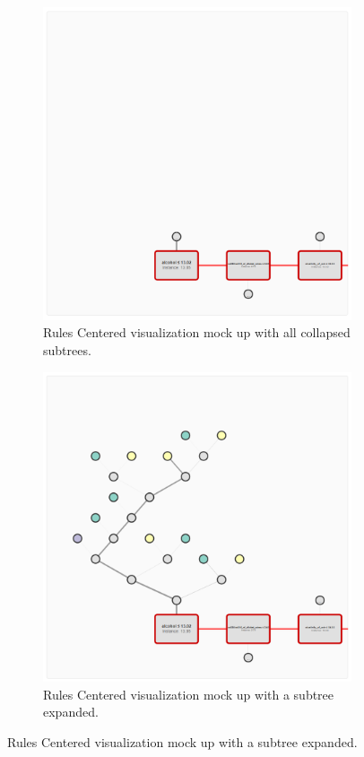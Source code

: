 \begin{figure}
    \centering

    \begin{subfigure}[c]{0.45\textwidth}
        \centering
        \includegraphics[width=\textwidth]{images/tree spawn v1 collapsed.png}
        \caption{Rules Centered visualization mock up with all collapsed subtrees.}
        \label{fig:collapsedSpawnTree}
    \end{subfigure}
    \hfill
    \begin{subfigure}[c]{0.45\textwidth}
        \centering
        \includegraphics[width=\textwidth]{images/tree spawn v1 expanded.png}
        \caption{Rules Centered visualization mock up with a subtree expanded.}
        \label{fig:expandedSpawnTree}
    \end{subfigure}
    

\end{figure}
